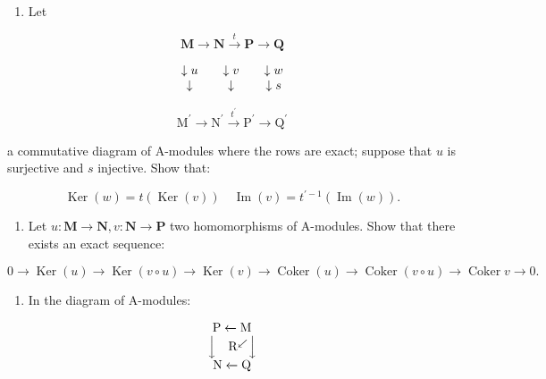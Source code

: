 
\begin{enumerate}
\def\labelenumi{\arabic{enumi})}
\tightlist
\item
  Let
\end{enumerate}

\[
\mathbf {M} \rightarrow \mathbf {N} \xrightarrow {t} \mathbf {P} \rightarrow \mathbf {Q}
\]

\[
\begin{array}{c c c c c} \downarrow u & & \downarrow v & & \downarrow w \\ \downarrow & & \downarrow & & \downarrow s \end{array}
\]

\[
\mathrm{M} ^ {\prime} \rightarrow \mathrm{N} ^ {\prime} \xrightarrow {t ^ {\prime}} \mathrm{P} ^ {\prime} \rightarrow \mathrm{Q} ^ {\prime}
\]

a commutative diagram of A-modules where the rows are exact; suppose that \(u\) is surjective and \(s\) injective. Show that:

\[
\operatorname{Ker} (w) = t (\operatorname{Ker} (v)) \quad \operatorname{Im} (v) = t ^ {\prime - 1} (\operatorname{Im} (w)).
\]

\begin{enumerate}
\def\labelenumi{\arabic{enumi})}
\setcounter{enumi}{1}
\tightlist
\item
  Let \(u: \mathbf{M} \to \mathbf{N}, v: \mathbf{N} \to \mathbf{P}\) two homomorphisms of A-modules. Show that there exists an exact sequence:
\end{enumerate}

\[
0 \rightarrow \operatorname{Ker} (u) \rightarrow \operatorname{Ker} (v \circ u) \rightarrow \operatorname{Ker} (v) \rightarrow \operatorname{Coker} (u) \rightarrow \operatorname{Coker} (v \circ u) \rightarrow \operatorname{Coker} v \rightarrow 0.
\]

\begin{enumerate}
\def\labelenumi{\arabic{enumi})}
\setcounter{enumi}{2}
\tightlist
\item
  In the diagram of A-modules:
\end{enumerate}

\[
\begin{array}{c} \mathrm{P} \xleftarrow {} \mathrm{M} \\ \Big \downarrow \quad \mathrm{R} ^ {\swarrow} \Big \downarrow \\ \mathrm{N} \xleftarrow {} \mathrm{Q} \end{array}
\]

